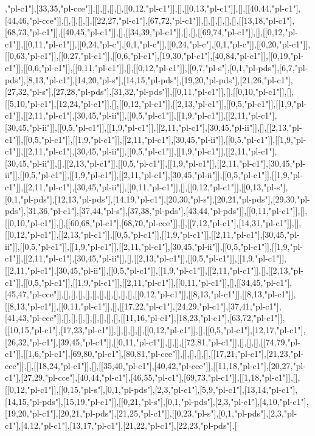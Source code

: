,"pl-c1"],[33,35,"pl-cce"]],[],[],[],[],[[0,12,"pl-c1"]],[],[[0,13,"pl-c1"]],[],[[40,44,"pl-c1"],[44,46,"pl-cce"]],[],[],[],[],[[22,27,"pl-c1"],[67,72,"pl-c1"]],[],[],[],[],[],[[13,18,"pl-c1"],[68,73,"pl-c1"]],[[40,45,"pl-c1"]],[],[[34,39,"pl-c1"]],[],[],[[69,74,"pl-c1"]],[],[[0,12,"pl-c1"]],[[0,11,"pl-c1"]],[[0,24,"pl-c"],[0,1,"pl-c"]],[[0,24,"pl-c"],[0,1,"pl-c"]],[[0,20,"pl-c1"]],[[0,63,"pl-c1"]],[[0,27,"pl-c1"]],[[0,6,"pl-c1"],[19,30,"pl-c1"],[40,84,"pl-c1"]],[[0,19,"pl-c1"]],[[0,6,"pl-c1"]],[[0,11,"pl-c1"]],[],[[0,12,"pl-c1"]],[[0,7,"pl-s"],[0,1,"pl-pds"],[6,7,"pl-pds"],[8,13,"pl-c1"],[14,20,"pl-s"],[14,15,"pl-pds"],[19,20,"pl-pds"],[21,26,"pl-c1"],[27,32,"pl-s"],[27,28,"pl-pds"],[31,32,"pl-pds"]],[[0,11,"pl-c1"]],[],[[0,10,"pl-c1"]],[],[[5,10,"pl-c1"],[12,24,"pl-c1"]],[],[[0,12,"pl-c1"]],[[2,13,"pl-c1"]],[[0,5,"pl-c1"]],[[1,9,"pl-c1"]],[[2,11,"pl-c1"],[30,45,"pl-ii"]],[[0,5,"pl-c1"]],[[1,9,"pl-c1"]],[[2,11,"pl-c1"],[30,45,"pl-ii"]],[[0,5,"pl-c1"]],[[1,9,"pl-c1"]],[[2,11,"pl-c1"],[30,45,"pl-ii"]],[],[[2,13,"pl-c1"]],[[0,5,"pl-c1"]],[[1,9,"pl-c1"]],[[2,11,"pl-c1"],[30,45,"pl-ii"]],[[0,5,"pl-c1"]],[[1,9,"pl-c1"]],[[2,11,"pl-c1"],[30,45,"pl-ii"]],[[0,5,"pl-c1"]],[[1,9,"pl-c1"]],[[2,11,"pl-c1"],[30,45,"pl-ii"]],[],[[2,13,"pl-c1"]],[[0,5,"pl-c1"]],[[1,9,"pl-c1"]],[[2,11,"pl-c1"],[30,45,"pl-ii"]],[[0,5,"pl-c1"]],[[1,9,"pl-c1"]],[[2,11,"pl-c1"],[30,45,"pl-ii"]],[[0,5,"pl-c1"]],[[1,9,"pl-c1"]],[[2,11,"pl-c1"],[30,45,"pl-ii"]],[[0,11,"pl-c1"]],[],[[0,12,"pl-c1"]],[[0,13,"pl-s"],[0,1,"pl-pds"],[12,13,"pl-pds"],[14,19,"pl-c1"],[20,30,"pl-s"],[20,21,"pl-pds"],[29,30,"pl-pds"],[31,36,"pl-c1"],[37,44,"pl-s"],[37,38,"pl-pds"],[43,44,"pl-pds"]],[[0,11,"pl-c1"]],[],[[0,10,"pl-c1"]],[],[[60,68,"pl-c1"],[68,70,"pl-cce"]],[],[[7,12,"pl-c1"],[14,31,"pl-c1"]],[],[[0,12,"pl-c1"]],[[2,13,"pl-c1"]],[[0,5,"pl-c1"]],[[1,9,"pl-c1"]],[[2,11,"pl-c1"],[30,45,"pl-ii"]],[[0,5,"pl-c1"]],[[1,9,"pl-c1"]],[[2,11,"pl-c1"],[30,45,"pl-ii"]],[[0,5,"pl-c1"]],[[1,9,"pl-c1"]],[[2,11,"pl-c1"],[30,45,"pl-ii"]],[],[[2,13,"pl-c1"]],[[0,5,"pl-c1"]],[[1,9,"pl-c1"]],[[2,11,"pl-c1"],[30,45,"pl-ii"]],[[0,5,"pl-c1"]],[[1,9,"pl-c1"]],[[2,11,"pl-c1"]],[],[[2,13,"pl-c1"]],[[0,5,"pl-c1"]],[[1,9,"pl-c1"]],[[2,11,"pl-c1"]],[[0,11,"pl-c1"]],[],[[34,45,"pl-c1"],[45,47,"pl-cce"]],[],[],[],[],[],[],[],[],[],[],[[0,12,"pl-c1"]],[[8,13,"pl-c1"]],[[8,13,"pl-c1"]],[[8,13,"pl-c1"]],[[0,11,"pl-c1"]],[],[[17,22,"pl-c1"],[24,29,"pl-c1"],[37,41,"pl-c1"],[41,43,"pl-cce"]],[],[],[],[],[],[],[],[],[[11,16,"pl-c1"],[18,23,"pl-c1"],[63,72,"pl-c1"]],[[10,15,"pl-c1"],[17,23,"pl-c1"]],[],[],[],[],[[0,12,"pl-c1"]],[],[[0,5,"pl-c1"],[12,17,"pl-c1"],[26,32,"pl-c1"],[39,45,"pl-c1"]],[[0,11,"pl-c1"]],[],[],[[72,81,"pl-c1"]],[],[],[],[[74,79,"pl-c1"]],[[1,6,"pl-c1"],[69,80,"pl-c1"],[80,81,"pl-cce"]],[],[],[],[],[[17,21,"pl-c1"],[21,23,"pl-cce"]],[],[[18,24,"pl-c1"]],[],[[35,40,"pl-c1"],[40,42,"pl-cce"]],[[11,18,"pl-c1"],[20,27,"pl-c1"],[27,29,"pl-cce"],[40,44,"pl-c1"],[46,55,"pl-c1"],[69,73,"pl-c1"]],[[1,18,"pl-c1"]],[],[[0,12,"pl-c1"]],[[0,15,"pl-s"],[0,1,"pl-pds"],[2,3,"pl-c1"],[5,9,"pl-c1"],[13,14,"pl-c1"],[14,15,"pl-pds"],[15,19,"pl-c1"]],[[0,21,"pl-s"],[0,1,"pl-pds"],[2,3,"pl-c1"],[4,10,"pl-c1"],[19,20,"pl-c1"],[20,21,"pl-pds"],[21,25,"pl-c1"]],[[0,23,"pl-s"],[0,1,"pl-pds"],[2,3,"pl-c1"],[4,12,"pl-c1"],[13,17,"pl-c1"],[21,22,"pl-c1"],[22,23,"pl-pds"],[